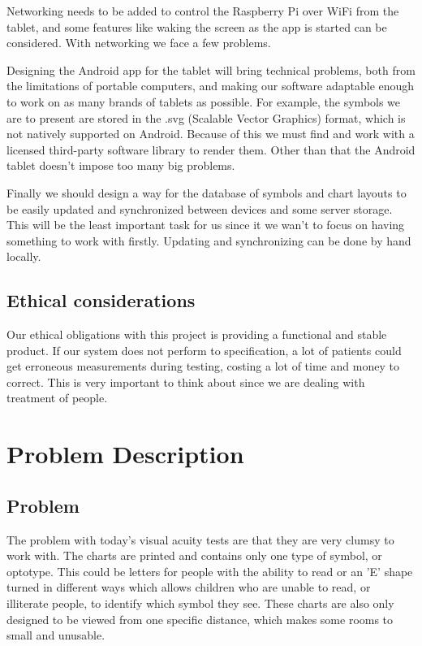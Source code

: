 \documentclass[12pt,a4paper,notitlepage]{report}
\begin{document}
Networking needs to be added to control the Raspberry Pi over WiFi from the tablet, and some features like waking the screen as the app is started can be considered. With networking we face a few problems. %

Designing the Android app for the tablet will bring technical problems, both from the limitations of portable computers, and making our software adaptable enough to work on as many brands of tablets as possible. For example, the symbols we are to present are stored in the .svg (Scalable Vector Graphics) format, which is not natively supported on Android. Because of this we must find and work with a licensed third-party software library to render them. Other than that the Android tablet doesn't impose too many big problems. %

Finally we should design a way for the database of symbols and chart layouts to be easily updated and synchronized between devices and some server storage. This will be the least important task for us since it we wan't to focus on having something to work with firstly. Updating and synchronizing can be done by hand locally.

\section{Ethical considerations} %
Our ethical obligations with this project is providing a functional and stable product. If our system does not perform to specification, a lot of patients could get erroneous measurements during testing, costing a lot of time and money to correct. This is very important to think about since we are dealing with treatment of people.

\chapter{Problem Description}
\section{Problem}
The problem with today's visual acuity tests are that they are very clumsy to work with. The charts are printed and contains only one type of symbol, or optotype. This could be letters for people with the ability to read or an 'E' shape turned in different ways which allows children who are unable to read, or illiterate people, to identify which symbol they see. These charts are also only designed to be viewed from one specific distance, which makes some rooms to small and unusable.
\end{document}
